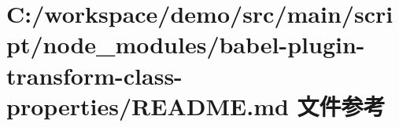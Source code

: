 \hypertarget{node__modules_2babel-plugin-transform-class-properties_2_r_e_a_d_m_e_8md}{}\section{C\+:/workspace/demo/src/main/script/node\+\_\+modules/babel-\/plugin-\/transform-\/class-\/properties/\+R\+E\+A\+D\+ME.md 文件参考}
\label{node__modules_2babel-plugin-transform-class-properties_2_r_e_a_d_m_e_8md}
